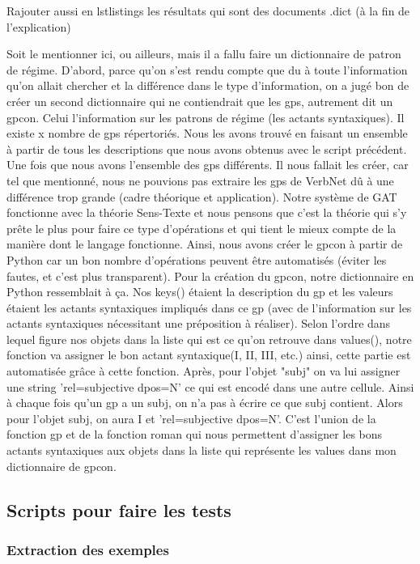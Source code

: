 Rajouter aussi en lstlistings les résultats qui sont des documents .dict (à la fin de l'explication)

Soit le mentionner ici, ou ailleurs, mais il a fallu faire un dictionnaire de patron de régime. D'abord, parce qu'on s'est rendu compte que du à toute l'information qu'on allait chercher et la différence dans le type d'information, on a jugé bon de créer un second dictionnaire qui ne contiendrait que les gps, autrement dit un gpcon. Celui l'information sur les patrons de régime (les actants syntaxiques). Il existe x nombre de gps répertoriés. Nous les avons trouvé en faisant un ensemble à partir de tous les descriptions que nous avons obtenus avec le script précédent. Une fois que nous avons l'ensemble des gps différents. Il nous fallait les créer, car tel que mentionné, nous ne pouvions pas extraire les gps de VerbNet dû à une différence trop grande (cadre théorique et application). Notre système de GAT fonctionne avec la théorie Sens-Texte et nous pensons que c'est la théorie qui s'y prête le plus pour faire ce type d'opérations et qui tient le mieux compte de la manière dont le langage fonctionne. Ainsi, nous avons créer le gpcon à partir de Python car un bon nombre d'opérations peuvent être automatisés (éviter les fautes, et c'est plus transparent). Pour la création du gpcon, notre dictionnaire en Python ressemblait à ça. Nos keys() étaient la description du gp et les valeurs étaient les actants syntaxiques impliqués dans ce gp (avec de l'information sur les actants syntaxiques nécessitant une préposition à réaliser). Selon l'ordre dans lequel figure nos objets dans la liste qui est ce qu'on retrouve dans values(), notre fonction va assigner le bon actant syntaxique(I, II, III, etc.) ainsi, cette partie est automatisée grâce à cette fonction. Après, pour l'objet "subj" on va lui assigner une string 'rel=subjective dpos=N' ce qui est encodé dans une autre cellule. Ainsi à chaque fois qu'un gp a  un subj, on n'a pas à écrire ce que subj contient. Alors pour l'objet subj, on aura I et 'rel=subjective dpos=N'. C'est l'union de la fonction gp et de la fonction roman qui nous permettent d'assigner les bons actants syntaxiques aux objets dans la liste qui représente les values dans mon dictionnaire de gpcon.

\subsection{Scripts pour faire les tests}

\subsubsection{Extraction des exemples}

